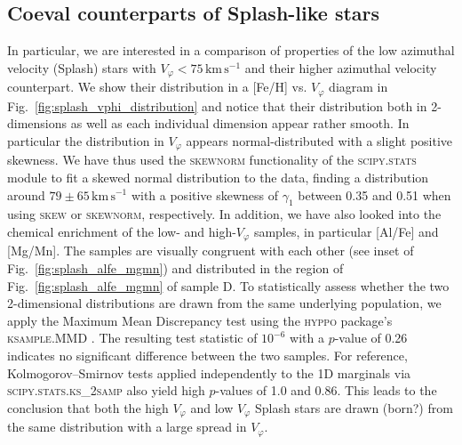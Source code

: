 \documentclass[fleqn,usenatbib]{mnras}
\begin{document}
\subsection{Coeval counterparts of Splash-like stars}

In particular, we are interested in a comparison of properties of the low azimuthal velocity (Splash) stars with $V_\varphi < 75\,\mathrm{km\,s^{-1}}$ and their higher azimuthal velocity counterpart. We show their distribution in a [Fe/H] vs. $V_\varphi$ diagram in Fig.~\ref{fig:splash_vphi_distribution} and notice that their distribution both in 2-dimensions as well as each individual dimension appear rather smooth. In particular the distribution in $V_\varphi$ appears normal-distributed with a slight positive skewness. We have thus used the \textsc{skewnorm} functionality of the \textsc{scipy.stats} module \citep{Scipy} to fit a skewed normal distribution to the data, finding a distribution around $79 \pm 65\,\mathrm{km\,s^{-1}}$ with a positive skewness of $\gamma_1$ between 0.35 and 0.51 when using \textsc{skew} or \textsc{skewnorm}, respectively. In addition, we have also looked into the chemical enrichment of the low- and high-$V_\varphi$ samples, in particular [Al/Fe] and [Mg/Mn]. The samples are visually congruent with each other (see inset of Fig.~\ref{fig:splash_alfe_mgmn}) and distributed in the region of Fig.~\ref{fig:splash_alfe_mgmn} of sample D. To statistically assess whether the two 2-dimensional distributions are drawn from the same underlying population, we apply the Maximum Mean Discrepancy test \citep{Gretton2012} using the \textsc{hyppo} package's \textsc{ksample.MMD} \citep{hyppo}. The resulting test statistic of $10^{-6}$ with a $p$-value of 0.26 indicates no significant difference between the two samples. For reference, Kolmogorov–Smirnov tests \citep{Hodges1958} applied independently to the 1D marginals via \textsc{scipy.stats.ks\_2samp} also yield high $p$-values of 1.0 and 0.86. This leads to the conclusion that both the high $V_\varphi$ and low $V_\varphi$ Splash stars are drawn (born?) from the same distribution with a large spread in $V_\varphi$.
\end{document}

